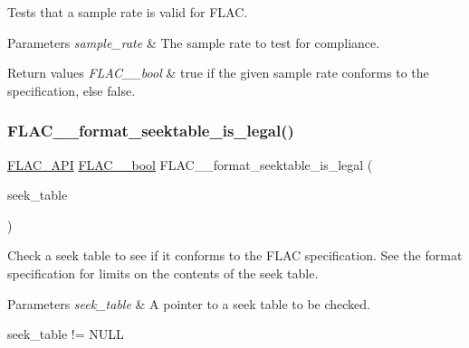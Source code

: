 Tests that a sample rate is valid for F\+L\+AC.


\begin{DoxyParams}{Parameters}
{\em sample\+\_\+rate} & The sample rate to test for compliance. \\
\hline
\end{DoxyParams}

\begin{DoxyRetVals}{Return values}
{\em F\+L\+A\+C\+\_\+\+\_\+bool} & {\ttfamily true} if the given sample rate conforms to the specification, else {\ttfamily false}. \\
\hline
\end{DoxyRetVals}
\mbox{\label{group__flac__format_ga02270d9b92dbe7617635c65a1d0f58ff}} 
\subsubsection{\texorpdfstring{F\+L\+A\+C\+\_\+\+\_\+format\+\_\+seektable\+\_\+is\+\_\+legal()}{FLAC\_\_format\_seektable\_is\_legal()}}
{\footnotesize\ttfamily \hyperlink{group__flac__export_ga56ca07df8a23310707732b1c0007d6f5}{F\+L\+A\+C\+\_\+\+A\+PI} \hyperlink{ordinals_8h_a95103469f1cbd78b8cf250194985b34e}{F\+L\+A\+C\+\_\+\+\_\+bool} F\+L\+A\+C\+\_\+\+\_\+format\+\_\+seektable\+\_\+is\+\_\+legal (\begin{DoxyParamCaption}\item[{\hyperlink{zconf_8h_a2c212835823e3c54a8ab6d95c652660e}{const} \hyperlink{struct_f_l_a_c_____stream_metadata___seek_table}{F\+L\+A\+C\+\_\+\+\_\+\+Stream\+Metadata\+\_\+\+Seek\+Table} $\ast$}]{seek\+\_\+table }\end{DoxyParamCaption})}

Check a seek table to see if it conforms to the F\+L\+AC specification. See the format specification for limits on the contents of the seek table.


\begin{DoxyParams}{Parameters}
{\em seek\+\_\+table} & A pointer to a seek table to be checked.  
\begin{DoxyCode}
seek\_table != NULL 
\end{DoxyCode}
 \\
\hline
\end{DoxyParams}

